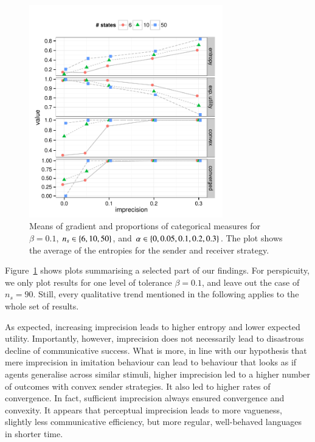 \documentclass[12pt,english]{article}
\newcommand{\imprecision}{\ensuremath{\alpha}} %
\newcommand{\toler}{\ensuremath{\beta}} %
\newcommand{\ns}{\ensuremath{n_s}} %
\numberwithin{equation}{section}
\begin{document}
\begin{figure}[t]
  \centering
  
  \includegraphics[width=0.75\textwidth]{plots/MeanMetrics3.pdf}

  \caption{Means of gradient and proportions of categorical measures
    for $\toler = 0.1$, $\ns \in \set{6, 10, 50}$, and $\imprecision
    \in \set{0, 0.05, 0.1, 0.2, 0.3}$. The plot shows the average of
    the entropies for the sender and receiver strategy.}
  \label{fig:MeanMetrics}
\end{figure}

Figure~\ref{fig:MeanMetrics} shows plots summarising a selected part of our findings.  For
perspicuity, we only plot results for one level of tolerance $\beta = 0.1$, and leave out the
case of $n_s = 90$. Still, every qualitative trend mentioned in the following applies to the
whole set of results.

As expected, increasing imprecision leads to higher entropy and lower expected
utility. Importantly, however, imprecision does not necessarily lead to disastrous decline of
communicative success. What is more, in line with our hypothesis that mere imprecision in
imitation behaviour can lead to behaviour that looks as if agents generalise across similar
stimuli, higher imprecision led to a higher number of outcomes with convex sender
strategies. It also led to higher rates of convergence. In fact, sufficient imprecision always
ensured convergence and convexity. It appears that perceptual imprecision leads to more
vagueness, slightly less communicative efficiency, but more regular, well-behaved languages in
shorter time.
\end{document}
